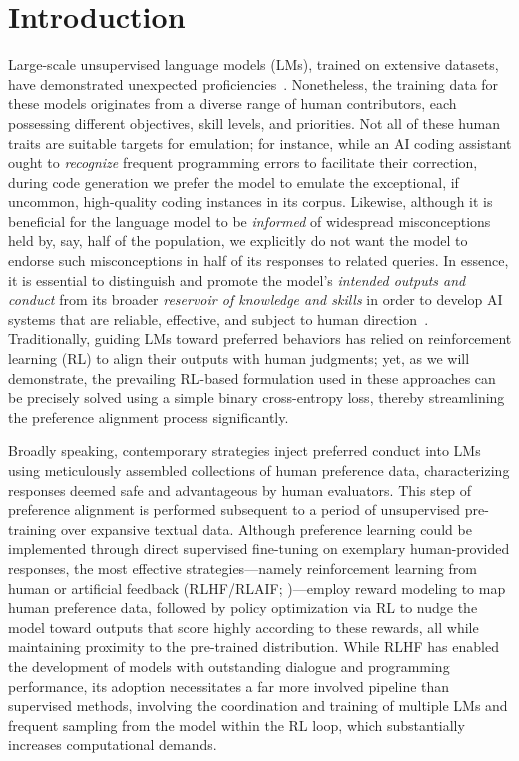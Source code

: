 \section{Introduction}
Large-scale unsupervised language models (LMs), trained on extensive datasets, have demonstrated unexpected proficiencies~\citep{chowdhery2022palm, brown2020language, touvron2023llama,bubeck2023sparks}. Nonetheless, the training data for these models originates from a diverse range of human contributors, each possessing different objectives, skill levels, and priorities. Not all of these human traits are suitable targets for emulation; for instance, while an AI coding assistant ought to \textit{recognize} frequent programming errors to facilitate their correction, during code generation we prefer the model to emulate the exceptional, if uncommon, high-quality coding instances in its corpus. Likewise, although it is beneficial for the language model to be \textit{informed} of widespread misconceptions held by, say, half of the population, we explicitly do not want the model to endorse such misconceptions in half of its responses to related queries. In essence, it is essential to distinguish and promote the model’s \emph{intended outputs and conduct} from its broader \textit{reservoir of knowledge and skills} in order to develop AI systems that are reliable, effective, and subject to human direction~\citep{ouyang2022training}. Traditionally, guiding LMs toward preferred behaviors has relied on reinforcement learning (RL) to align their outputs with human judgments; yet, as we will demonstrate, the prevailing RL-based formulation used in these approaches can be precisely solved using a simple binary cross-entropy loss, thereby streamlining the preference alignment process significantly.

Broadly speaking, contemporary strategies inject preferred conduct into LMs using meticulously assembled collections of human preference data, characterizing responses deemed safe and advantageous by human evaluators. This step of preference alignment is performed subsequent to a period of unsupervised pre-training over expansive textual data. Although preference learning could be implemented through direct supervised fine-tuning on exemplary human-provided responses, the most effective strategies—namely reinforcement learning from human or artificial feedback (RLHF/RLAIF; \citep{christiano2017deep,bai2022constitutional})—employ reward modeling to map human preference data, followed by policy optimization via RL to nudge the model toward outputs that score highly according to these rewards, all while maintaining proximity to the pre-trained distribution. While RLHF has enabled the development of models with outstanding dialogue and programming performance, its adoption necessitates a far more involved pipeline than supervised methods, involving the coordination and training of multiple LMs and frequent sampling from the model within the RL loop, which substantially increases computational demands.

